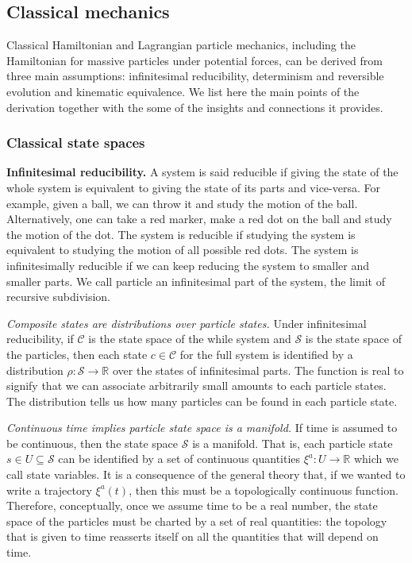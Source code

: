 \documentclass[twocolumn]{article}
\begin{document}
\subsection{Classical mechanics}

Classical Hamiltonian and Lagrangian particle mechanics, including the Hamiltonian for massive particles under potential forces, can be derived from three main assumptions: infinitesimal reducibility, determinism and reversible evolution and kinematic equivalence. We list here the main points of the derivation together with the some of the insights and connections it provides.

\subsubsection{Classical state spaces}

\textbf{Infinitesimal reducibility.} A system is said reducible if giving the state of the whole system is equivalent to giving the state of its parts and vice-versa. For example, given a ball, we can throw it and study the motion of the ball. Alternatively, one can take a red marker, make a red dot on the ball and study the motion of the dot. The system is reducible if studying the system is equivalent to studying the motion of all possible red dots. The system is infinitesimally reducible if we can keep reducing the system to smaller and smaller parts. We call particle an infinitesimal part of the system, the limit of recursive subdivision.

\emph{Composite states are distributions over particle states.} Under infinitesimal reducibility, if $\mathcal{C}$ is the state space of the while system and $\mathcal{S}$ is the state space of the particles, then each state $c \in \mathcal{C}$ for the full system is identified by a distribution $\rho : \mathcal{S} \to \mathbb{R}$ over the states of infinitesimal parts. The function is real to signify that we can associate arbitrarily small amounts to each particle states. The distribution tells us how many particles can be found in each particle state.

\emph{Continuous time implies particle state space is a manifold.} If time is assumed to be continuous, then the state space $\mathcal{S}$ is a manifold. That is, each particle state $s \in U \subseteq \mathcal{S}$ can be identified by a set of continuous quantities $\xi^a : U \to \mathbb{R}$ which we call state variables. It is a consequence of the general theory that, if we wanted to write a trajectory $\xi^a(t)$, then this must be a topologically continuous function. Therefore, conceptually, once we assume time to be a real number, the state space of the particles must be charted by a set of real quantities: the topology that is given to time reasserts itself on all the quantities that will depend on time.
\end{document}
